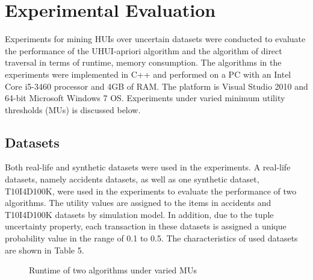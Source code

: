 \documentclass[conference]{IEEEtran}
\begin{document}
\section{Experimental Evaluation}

Experiments for mining HUIs over uncertain datasets were conducted to evaluate the performance of the UHUI-apriori algorithm and the algorithm of direct traversal in terms of runtime, memory consumption. The algorithms in the experiments were implemented in C++ and performed on a PC with an Intel Core i5-3460 processor and 4GB of RAM. The platform is Visual Studio 2010 and 64-bit Microsoft Windows 7 OS. Experiments under varied minimum utility thresholds (MUs) is discussed below.

\vspace{-0.2cm}
\subsection{Datasets}

Both real-life and synthetic datasets were used in the experiments. A real-life datasets, namely accidents datasets, as well as one synthetic dataset, T10I4D100K, were used in the experiments to evaluate the performance of two algorithms. The utility values are assigned to the items in accidents and T10I4D100K datasets by simulation model. In addition, due to the tuple uncertainty property, each transaction in these datasets is assigned a unique probability value in the range of 0.1 to 0.5. The characteristics of used datasets are shown in Table 5.
\begin{figure}[htbp]
\vspace{-0.3cm}
  \centering
\vspace{-0.3cm}
  \caption{Runtime of two algorithms under varied MUs}
  \label{fig:time}
\vspace{-0.4cm}
\end{figure}
\end{document}
